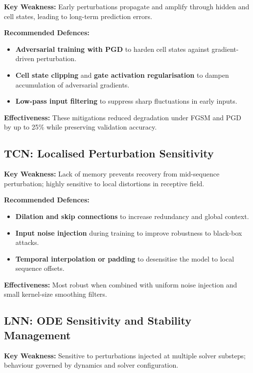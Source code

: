 \textbf{Key Weakness:} Early perturbations propagate and amplify through hidden and cell states, leading to long-term prediction errors.

\textbf{Recommended Defences:}
\begin{itemize}
    \item \textbf{Adversarial training with PGD} to harden cell states against gradient-driven perturbation.
    \item \textbf{Cell state clipping} and \textbf{gate activation regularisation} to dampen accumulation of adversarial gradients.
    \item \textbf{Low-pass input filtering} to suppress sharp fluctuations in early inputs.
\end{itemize}

\textbf{Effectiveness:} These mitigations reduced degradation under FGSM and PGD by up to 25\% while preserving validation accuracy.

\subsection{TCN: Localised Perturbation Sensitivity}

\textbf{Key Weakness:} Lack of memory prevents recovery from mid-sequence perturbation; highly sensitive to local distortions in receptive field.

\textbf{Recommended Defences:}
\begin{itemize}
    \item \textbf{Dilation and skip connections} to increase redundancy and global context.
    \item \textbf{Input noise injection} during training to improve robustness to black-box attacks.
    \item \textbf{Temporal interpolation or padding} to desensitise the model to local sequence offsets.
\end{itemize}

\textbf{Effectiveness:} Most robust when combined with uniform noise injection and small kernel-size smoothing filters.

\subsection{LNN: ODE Sensitivity and Stability Management}

\textbf{Key Weakness:} Sensitive to perturbations injected at multiple solver substeps; behaviour governed by dynamics and solver configuration.

